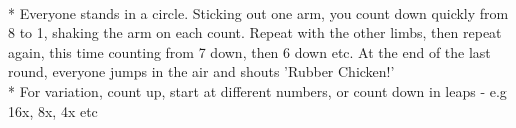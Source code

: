 \begin{minipage}{\textwidth}
\\*
Everyone stands in a circle. Sticking out one arm, you count down quickly from 8 to 1, shaking the arm on each count.  Repeat with the other limbs, then repeat again, this time counting from 7 down, then 6 down etc.  At the end of the last round, everyone jumps in the air and shouts 'Rubber Chicken!'
\\*
For variation, count up, start at different numbers, or count down in leaps - e.g 16x, 8x, 4x etc
\end{minipage}    \vfill
